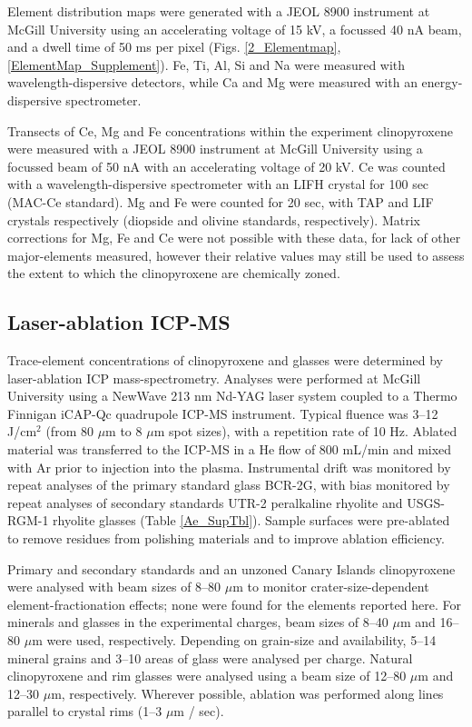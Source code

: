 \documentclass[final,authoryear,3p,times,twocolumn]{elsarticle}
\begin{document}
Element distribution maps were generated with a JEOL 8900 instrument at McGill University using an accelerating voltage of 15 kV, a focussed 40 nA beam, and a dwell time of 50 ms per pixel (Figs. \ref{2_Elementmap}, \ref{ElementMap_Supplement}). Fe, Ti, Al, Si and Na were measured with wavelength-dispersive detectors, while Ca and Mg were measured with an energy-dispersive spectrometer.

Transects of Ce, Mg and Fe concentrations within the experiment clinopyroxene were measured with a JEOL 8900 instrument at McGill University using a focussed beam of 50 nA with an accelerating voltage of 20 kV. Ce was counted with a wavelength-dispersive spectrometer with an LIFH crystal for 100 sec (MAC-Ce standard). Mg and Fe were counted for 20 sec, with TAP and LIF crystals respectively (diopside and olivine standards, respectively). Matrix corrections for Mg, Fe and Ce were not possible with these data, for lack of other major-elements measured, however their relative values may still be used to assess the extent to which the clinopyroxene are chemically zoned.  

\subsection{Laser-ablation ICP-MS}
Trace-element concentrations of clinopyroxene and glasses were determined by laser-ablation ICP mass-spectrometry. Analyses were performed at McGill University using a NewWave 213 nm Nd-YAG laser system coupled to a Thermo Finnigan iCAP-Qc quadrupole ICP-MS instrument. Typical fluence was 3--12 J/cm$^2$ (from 80 $\mu$m to 8 $\mu$m spot sizes), with a repetition rate of 10 Hz. Ablated material was transferred to the ICP-MS in a He flow of 800 mL/min and mixed with Ar prior to injection into the plasma. Instrumental drift was monitored by repeat analyses of the primary standard glass BCR-2G, with bias monitored by repeat analyses of secondary standards UTR-2 peralkaline rhyolite and USGS-RGM-1 rhyolite glasses (Table \ref{Ae_SupTbl}). Sample surfaces were pre-ablated to remove residues from polishing materials and to improve ablation efficiency. 

Primary and secondary standards and an unzoned Canary Islands clinopyroxene were analysed with beam sizes of 8--80 $\mu$m to monitor crater-size-dependent element-fractionation effects; none were found for the elements reported here. For minerals and glasses in the experimental charges, beam sizes of 8--40 $\mu$m and 16--80 $\mu$m were used, respectively. Depending on grain-size and availability, 5--14 mineral grains and 3--10 areas of glass were analysed per charge. Natural clinopyroxene and rim glasses were analysed using a beam size of 12--80 $\mu$m and 12--30 $\mu$m, respectively. Wherever possible, ablation was performed along lines parallel to crystal rims (1--3 $\mu$m / sec).
\end{document}
